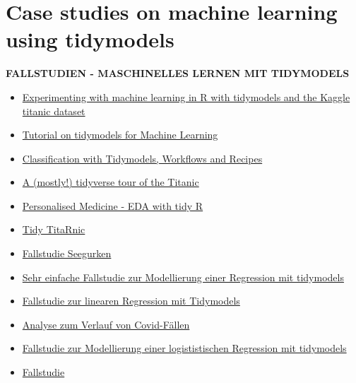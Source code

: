 \documentclass[
  letterpaper,
  DIV=11,
  numbers=noendperiod]{scrreprt}
\theoremstyle{definition}
\theoremstyle{definition}
\theoremstyle{remark}
\begin{document}
\hypertarget{case-studies-on-machine-learning-using-tidymodels}{%
\section{Case studies on machine learning using
tidymodels}\label{case-studies-on-machine-learning-using-tidymodels}}

\textbf{FALLSTUDIEN - MASCHINELLES LERNEN MIT TIDYMODELS}

\begin{itemize}
\item
  \href{https://www.r-bloggers.com/2021/08/experimenting-with-machine-learning-in-r-with-tidymodels-and-the-kaggle-titanic-dataset/}{Experimenting
  with machine learning in R with tidymodels and the Kaggle titanic
  dataset}
\item
  \href{https://hansjoerg.me/2020/02/09/tidymodels-for-machine-learning/}{Tutorial
  on tidymodels for Machine Learning}
\item
  \href{https://www.kirenz.com/post/2021-02-17-r-classification-tidymodels/}{Classification
  with Tidymodels, Workflows and Recipes}
\item
  \href{https://www.kaggle.com/code/varimp/a-mostly-tidyverse-tour-of-the-titanic/report}{A
  (mostly!) tidyverse tour of the Titanic}
\item
  \href{https://www.kaggle.com/code/headsortails/personalised-medicine-eda-with-tidy-r/report}{Personalised
  Medicine - EDA with tidy R}
\item
  \href{https://www.kaggle.com/code/headsortails/tidy-titarnic/report}{Tidy
  TitaRnic}
\item
  \href{https://www.tidymodels.org/start/models/}{Fallstudie Seegurken}
\item
  \href{https://juliasilge.com/blog/student-debt/}{Sehr einfache
  Fallstudie zur Modellierung einer Regression mit tidymodels}
\item
  \href{https://www.gmudatamining.com/lesson-10-r-tutorial.html}{Fallstudie
  zur linearen Regression mit Tidymodels}
\item
  \href{https://github.com/sebastiansauer/covid-icu}{Analyse zum Verlauf
  von Covid-Fällen}
\item
  \href{https://onezero.blog/modelling-binary-logistic-regression-using-tidymodels-library-in-r-part-1/}{Fallstudie
  zur Modellierung einer logististischen Regression mit tidymodels}
\item
  \href{https://juliasilge.com/blog/multinomial-volcano-eruptions/}{Fallstudie
}
\end{itemize}
\end{document}
